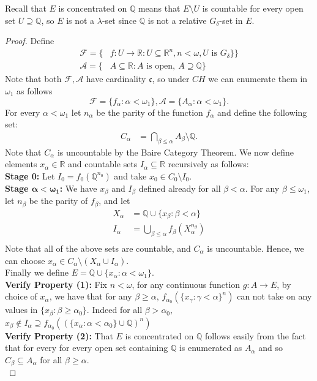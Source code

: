 \documentclass[11pt]{amsart}
\theoremstyle{definition}
\theoremstyle{remark}
\newcommand{\R}{\mathbb{R}}
\newcommand{\Q}{\mathbb{Q}}
\newcommand{\Aa}{\mathcal{A}}
\newcommand{\Ff}{\mathcal{F}}
\theoremstyle{plain}
\begin{document}
Recall that $E$ is concentrated on $\Q$ means that $E\setminus U$ is countable for every open set $U\supseteq \Q$, so $E$ is not a $\lambda$-set since $\Q$ is not a relative $G_\delta$-set in $E$.
\begin{proof}
    Define
    \begin{align*}
        \Ff=\{&f:U\to \R:  U \subseteq \R^n,n<\omega, U \text{ is } G_\delta\}\}\\
        \Aa= \{&A\subseteq\R: A \text{ is open},\ A\supseteq \Q\}
    \end{align*}
    Note that both $\Ff,\Aa$ have cardinality $\mathfrak{c}$, so under $CH$ we can enumerate them in $\omega_1$ as follows
    \[\Ff=\{f_{\alpha}:\alpha<\omega_1\}, \Aa=\{A_\alpha:\alpha<\omega_1\}. \]
     For every $\alpha<\omega_1$ let $n_\alpha$ be the parity of the function $f_\alpha$ and define the following set:
    \begin{align*}
        C_\alpha&= \bigcap_{\beta\leq \alpha} A_\beta \setminus \Q.
    \end{align*}
    Note that $C_\alpha$ is uncountable by the Baire Category Theorem. We now define elements $x_\alpha\in \R$ and countable sets $I_\alpha\subseteq {\mathbb R}$ recursively as follows: \\
    \textbf{Stage 0:} Let $I_0=f_0({\mathbb Q}^{n_0})$ and take $x_0\in C_0\setminus I_0$.\\
    \textbf{Stage $\boldsymbol{\alpha<\omega_1}$:} We have $x_\beta$ and $I_\beta$ defined already for all $\beta<\alpha$. For any $\beta\leq \omega_1$, let $n_\beta$ be the parity of $f_\beta$, and let
    \begin{align*}
        X_\alpha&= {\mathbb Q}\cup \{x_\beta:\beta<\alpha\} \\
        I_\alpha&= \bigcup_{\beta\leq \alpha} f_\beta(X_\alpha^{n_\beta})\\
    \end{align*}
    Note that all of the above sets are countable, and $C_\alpha$ is uncountable. Hence, we can choose $x_\alpha\in C_\alpha\setminus (X_\alpha\cup I_\alpha )$. \\
    Finally we define $E=\Q\cup \{x_\alpha:\alpha<\omega_1\}$.\\
     \textbf{Verify Property (1):} Fix $n<\omega$, for any continuous function $g:A\to E$, by choice of $x_\alpha$, we have that for any $\beta \geq \alpha$,
     $f_{\alpha_0}(\{x_\gamma:\gamma <\alpha\}^n)$ can not take on any values in $\{x_\beta:\beta\geq\alpha_0\}$. Indeed for all $\beta>\alpha_0,$ $x_\beta\not \in I_\alpha \supseteq f_{\alpha_0}((\{x_\alpha:\alpha<\alpha_0\}\cup \Q)^n)$\\
    \textbf{Verify Property (2):} That $E$ is concentrated on $\Q$ follows easily from the fact that for every for every open set containing ${\mathbb Q}$ is enumerated as $A_\alpha$ and so $C_\beta\subseteq A_\alpha$ for all $\beta\geq \alpha$. \\
\end{proof}
\end{document}

